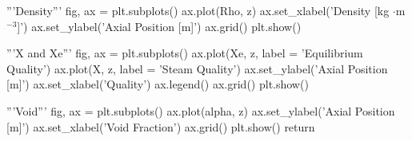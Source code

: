 \documentclass{article}
\begin{document}
\begin{python}
        '''Density'''
        fig, ax = plt.subplots()
        ax.plot(Rho, z)
        ax.set_xlabel('Density  [kg $\cdot$m$^{-3}$]')
        ax.set_ylabel('Axial Position  [m]')
        ax.grid()
        plt.show()

        '''X and Xe'''
        fig, ax = plt.subplots()
        ax.plot(Xe, z, label = 'Equilibrium Quality')
        ax.plot(X, z, label = 'Steam Quality')
        ax.set_ylabel('Axial Position  [m]')
        ax.set_xlabel('Quality')
        ax.legend()
        ax.grid()
        plt.show()

        '''Void'''
        fig, ax = plt.subplots()
        ax.plot(alpha, z)
        ax.set_ylabel('Axial Position  [m]')
        ax.set_xlabel('Void Fraction')
        ax.grid()
        plt.show()
        return

\end{python}
\end{document}
